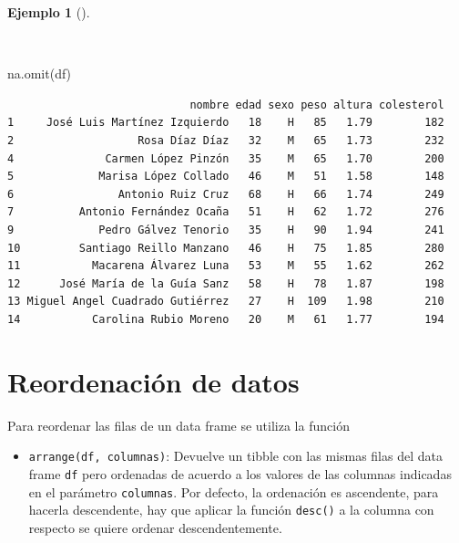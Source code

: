\documentclass[
  a4paper,
]{scrreport}
\newenvironment{Shaded}{\begin{snugshade}}{\end{snugshade}}
\newcommand{\FunctionTok}[1]{\textcolor[rgb]{0.28,0.35,0.67}{#1}}
\newcommand{\NormalTok}[1]{\textcolor[rgb]{0.00,0.23,0.31}{#1}}
\providecommand{\tightlist}{%
  \setlength{\itemsep}{0pt}\setlength{\parskip}{0pt}}\usepackage{longtable,booktabs,array}
\theoremstyle{definition}
\theoremstyle{definition}
\newtheorem{example}{Ejemplo}[chapter]
\theoremstyle{remark}
\begin{document}
\begin{example}[]\protect\hypertarget{exm-filter-na}{}\label{exm-filter-na}

~

\begin{Shaded}
\begin{Highlighting}[]
\FunctionTok{na.omit}\NormalTok{(df)}
\end{Highlighting}
\end{Shaded}

\begin{verbatim}
                            nombre edad sexo peso altura colesterol
1     José Luis Martínez Izquierdo   18    H   85   1.79        182
2                   Rosa Díaz Díaz   32    M   65   1.73        232
4              Carmen López Pinzón   35    M   65   1.70        200
5             Marisa López Collado   46    M   51   1.58        148
6                Antonio Ruiz Cruz   68    H   66   1.74        249
7          Antonio Fernández Ocaña   51    H   62   1.72        276
9             Pedro Gálvez Tenorio   35    H   90   1.94        241
10         Santiago Reillo Manzano   46    H   75   1.85        280
11           Macarena Álvarez Luna   53    M   55   1.62        262
12      José María de la Guía Sanz   58    H   78   1.87        198
13 Miguel Angel Cuadrado Gutiérrez   27    H  109   1.98        210
14           Carolina Rubio Moreno   20    M   61   1.77        194
\end{verbatim}

\end{example}

\section{Reordenación de datos}\label{reordenaciuxf3n-de-datos}

Para reordenar las filas de un data frame se utiliza la función

\begin{itemize}
\tightlist
\item
  \texttt{arrange(df,\ columnas)}: Devuelve un tibble con las mismas
  filas del data frame \texttt{df} pero ordenadas de acuerdo a los
  valores de las columnas indicadas en el parámetro \texttt{columnas}.
  Por defecto, la ordenación es ascendente, para hacerla descendente,
  hay que aplicar la función \texttt{desc()} a la columna con respecto
  se quiere ordenar descendentemente.
\end{itemize}
\end{document}
